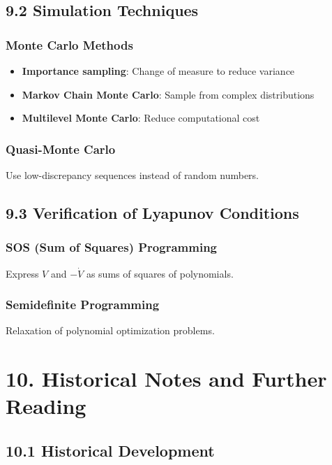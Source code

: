 \documentclass{amsart}
\theoremstyle{plain}
\theoremstyle{definition}
\theoremstyle{remark}
\begin{document}
\subsection{9.2 Simulation Techniques}

\subsubsection{Monte Carlo Methods}

\begin{itemize}
	\item \textbf{Importance sampling}: Change of measure to reduce variance
	\item \textbf{Markov Chain Monte Carlo}: Sample from complex distributions
	\item \textbf{Multilevel Monte Carlo}: Reduce computational cost
\end{itemize}

\subsubsection{Quasi-Monte Carlo}

Use low-discrepancy sequences instead of random numbers.

\subsection{9.3 Verification of Lyapunov Conditions}

\subsubsection{SOS (Sum of Squares) Programming}

Express $V$ and $-\dot{V}$ as sums of squares of polynomials.

\subsubsection{Semidefinite Programming}

Relaxation of polynomial optimization problems.

\section{10. Historical Notes and Further Reading}

\subsection{10.1 Historical Development}
\end{document}
